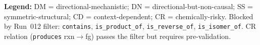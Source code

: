\begin{table}[h]
\smallskip
\noindent\textbf{Legend:}
DM = directional-mechanistic;
DN = directional-but-non-causal;
SS = symmetric-structural;
CD = context-dependent;
CR = chemically-risky.
Blocked by Run~012 filter: \texttt{contains}, \texttt{is\_product\_of},
\texttt{is\_reverse\_of}, \texttt{is\_isomer\_of}.
CR relation (\texttt{produces} rxn$\to$fg) passes the filter but requires
pre-validation.
\end{table}

